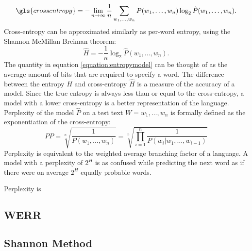 	\begin{equation}
		\gls{crossentropy}=-\lim_{n\to\infty}\frac{1}{n}\sum_{w_{1}, \dots, w_{n}}P(w_{1}, \dots, w_{n})\log_{2}\hat{P}(w_{1}, \dots, w_{n}).
		\label{equation:crossentropy}
	\end{equation}
	Cross-entropy can be approximated similarly as per-word entropy, using the Shannon-McMillan-Breiman theorem:
	\begin{equation}
		\hat{H}=-\frac{1}{n}\log_{2}\hat{P}(w_{1}, \dots, w_{n}).
		\label{equation:entropymodel}
	\end{equation}
	The quantity in equation \ref{equation:entropymodel} can be thought of as the average amount of bits that are required to specify a word. The difference between the entropy $H$ and cross-entropy $\hat{H}$ is a measure of the accuracy of a model. Since the true entropy is always less than or equal to the cross-entropy, a model with a lower cross-entropy is a better representation of the language. Perplexity of the model $\hat{P}$ on a test text $W=w_{1}, \dots, w_{n}$ is formally defined as the exponentiation of the cross-entropy:
	\begin{equation}
		PP=\sqrt[n]{\frac{1}{P(w_{1}, \dots, w_{n})}}=\sqrt[n]{\prod_{i=1}^{n}\frac{1}{P(w_{i}|w_{1}, \dots, w_{i-1})}}
		\label{equation:perplexity}
	\end{equation}
	Perplexity is equivalent to the weighted average branching factor of a language. A model with a perplexity of $2^{H}$ is as confused while predicting the next word as if there were on average $2^{H}$ equally probable words.

Perplexity is 
	\subsection{WERR}
	\label{subsection:werr}
	\subsection{Shannon Method}

